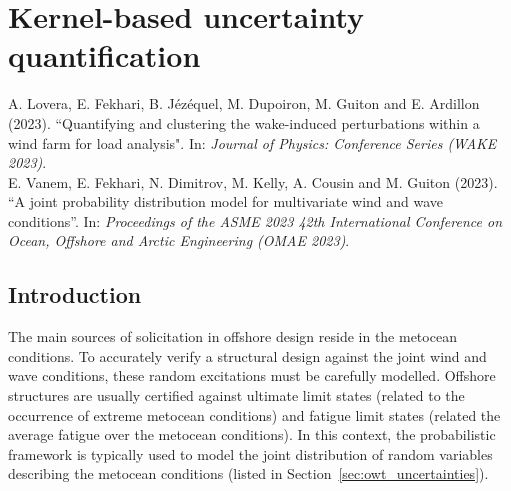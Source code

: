 \cleardoublepage
\chapter{Kernel-based uncertainty quantification}
\label{chpt:3}
\hfill
\localtableofcontents
\newpage


\begin{tcolorbox}[colback=gray!5!white, colframe=gray!5!white, coltitle=gray!70!white, coltext=gray!60!white, title=\textbf{Parts of this chapter are adapted from the following references:}]
    A. Lovera, E. Fekhari, B. Jézéquel, M. Dupoiron, M. Guiton and E. Ardillon (2023). ``Quantifying and clustering the wake-induced perturbations within a wind farm for load analysis". In: \textit{Journal of Physics: Conference Series (WAKE 2023)}.\\

    E. Vanem, E. Fekhari, N. Dimitrov, M. Kelly, A. Cousin and M. Guiton (2023). ``A joint probability distribution model for multivariate wind and wave conditions''. In: \textit{Proceedings of the ASME 2023 42th International Conference on Ocean, Offshore and Arctic Engineering (OMAE 2023)}.
\end{tcolorbox}

\section{Introduction}
The main sources of solicitation in offshore design reside in the metocean conditions. 
To accurately verify a structural design against the joint wind and wave conditions, these random excitations must be carefully modelled. 
Offshore structures are usually certified against ultimate limit states (related to the occurrence of extreme metocean conditions) and fatigue limit states (related the average fatigue over the metocean conditions). 
In this context, the probabilistic framework is typically used to model the joint distribution of random variables describing the metocean conditions (listed in Section~\ref{sec:owt_uncertainties}). 

